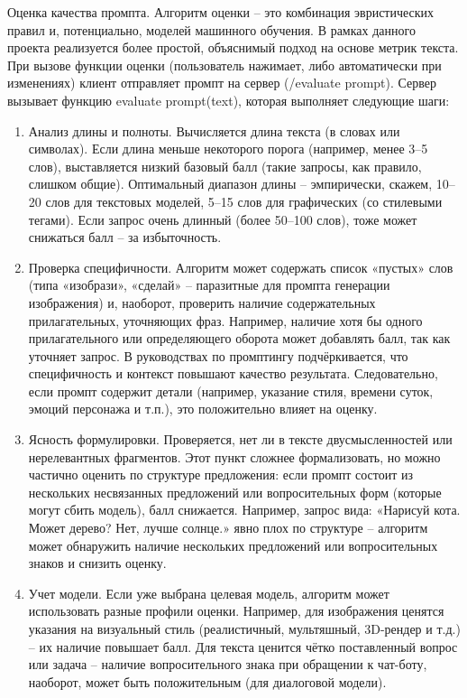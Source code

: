 Оценка качества промпта. Алгоритм оценки – это комбинация эвристических правил и, потенциально, моделей машинного обучения. В рамках данного проекта реализуется более простой, объяснимый подход на основе метрик текста. При вызове функции оценки (пользователь нажимает, либо автоматически при изменениях) клиент отправляет промпт на сервер (/evaluate prompt). Сервер вызывает функцию evaluate prompt(text), которая выполняет следующие шаги:
\begin{enumerate}[label=\arabic*]
    \item Анализ длины и полноты. Вычисляется длина текста (в словах или символах). Если длина меньше некоторого порога (например, менее 3–5 слов), выставляется низкий базовый балл (такие запросы, как правило, слишком общие). Оптимальный диапазон длины – эмпирически, скажем, 10–20 слов для текстовых моделей, 5–15 слов для графических (со стилевыми тегами). Если запрос очень длинный (более 50–100 слов), тоже может снижаться балл – за избыточность.
    \item Проверка специфичности. Алгоритм может содержать список «пустых» слов (типа «изобрази», «сделай» – паразитные для промпта генерации изображения) и, наоборот, проверить наличие содержательных прилагательных, уточняющих фраз. Например, наличие хотя бы одного прилагательного или определяющего оборота может добавлять балл, так как уточняет запрос. В руководствах по промптингу подчёркивается, что специфичность и контекст повышают качество результата\cite{promptingguide:basics}. Следовательно, если промпт содержит детали (например, указание стиля, времени суток, эмоций персонажа и т.п.), это положительно влияет на оценку.
    \item Ясность формулировки. Проверяется, нет ли в тексте двусмысленностей или нерелевантных фрагментов. Этот пункт сложнее формализовать, но можно частично оценить по структуре предложения: если промпт состоит из нескольких несвязанных предложений или вопросительных форм (которые могут сбить модель), балл снижается. Например, запрос вида: «Нарисуй кота. Может дерево? Нет, лучше солнце.» явно плох по структуре – алгоритм может обнаружить наличие нескольких предложений или вопросительных знаков и снизить оценку.
    \item Учет модели. Если уже выбрана целевая модель, алгоритм может использовать разные профили оценки. Например, для изображения ценятся указания на визуальный стиль (реалистичный, мультяшный, 3D-рендер и т.д.) – их наличие повышает балл. Для текста ценится чётко поставленный вопрос или задача – наличие вопросительного знака при обращении к чат-боту, наоборот, может быть положительным (для диалоговой модели).

\end{enumerate}
